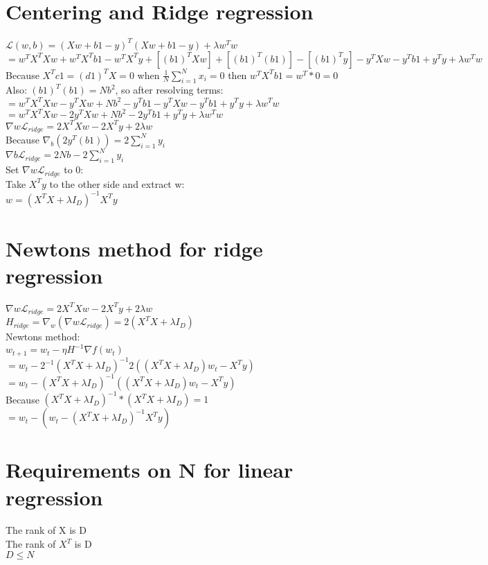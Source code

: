 \section{Centering and Ridge regression}
$\mathcal{L}(w,b)=(Xw +b1-y)^{T}(Xw +b1-y)+\lambda w^{T}w$\\ $=w^{T}X^{T}Xw+w^{T}
X^{T}b1-w^{T}X^{T}y +[(b1)^{T}Xw]+[(b1)^{T}(b1)]-[(b1)^{T}y]-y^{T}Xw-y^{T}b1+y^{T}
y+\lambda w^{T}w$\\ Because $X^{T}c1=(d1)^{T}X=0$ when
$\frac{1}{N}\sum_{i=1}^{N}x_{i}= 0$ then $w^{T}X^{T}b1=w^{T}*0=0$\\ Also:
$(b1)^{T}(b1) = Nb^{2}$, so after resolving terms:\\ $=w^{T}X^{T}Xw-y^{T}Xw +Nb^{2}
-y^{T}b1-y^{T}Xw-y^{T}b1 +y^{T}y +\lambda w^{T}w$\\
$=w^{T}X^{T}Xw-2y^{T}Xw +Nb^{2}-2y^{T}b1+y^{T}y +\lambda w^{T}w$\\ $\nabla{w}\mathcal{L}
_{ridge}=2X^{T}Xw-2X^{T}y+2\lambda w$\\ Because
$\nabla_{b}(2y^{T}(b1))=2\sum_{i=1}^{N}y_{i}$\\ $\nabla{b}\mathcal{L}_{ridge}=2N
b-2\sum_{i=1}^{N}y_{i}$\\ Set $\nabla{w}\mathcal{L}_{ridge}$ to 0:\\ Take
$X^{T}y$ to the other side and extract w:\\
$w=(X^{T}X+\lambda I_{D})^{-1}X^{T}y$\\
\section{Newtons method for ridge regression}
$\nabla{w}\mathcal{L}_{ridge}=2X^{T}Xw-2X^{T}y+2\lambda w$\\
$H_{ridge}=\nabla_{w}(\nabla{w}\mathcal{L}_{ridge})=2(X^{T}X+\lambda I_{D})$\\ Newtons
method:\\ $w_{t+1}=w_{t}-\eta H^{-1}\nabla f(w_{t})$\\
$=w_{t}-2^{-1}(X^{T}X+\lambda I_{D})^{-1}2((X^{T}X+\lambda I_{D})w_{t}-X^{T}y)$\\
$=w_{t}-(X^{T}X+\lambda I_{D})^{-1}((X^{T}X+\lambda I_{D})w_{t}-X^{T}y)$\\
Because $(X^{T}X+\lambda I_{D})^{-1}*(X^{T}X+\lambda I_{D})=1$\\ $=w_{t}-(w_{t}-(
X^{T}X+\lambda I_{D})^{-1}X^{T}y)$
\section{Requirements on N for linear regression}
The rank of X is D\\ The rank of $X^{T}$ is D\\ $D \leq N$\\